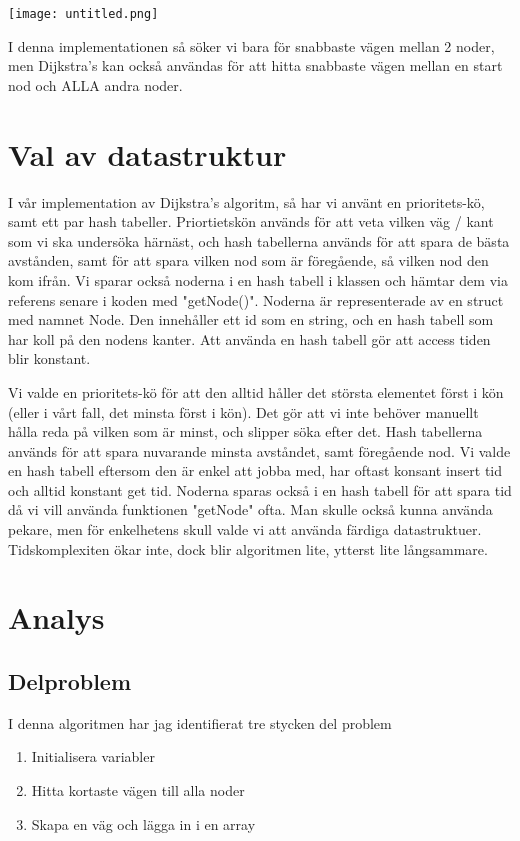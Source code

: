 \documentclass[fleqn,10pt]{article}
\begin{document}
\texttt{[image: untitled.png]}



I denna implementationen så söker vi bara för snabbaste vägen mellan 2 noder, men Dijkstra's kan också användas för att hitta snabbaste vägen mellan en start nod och ALLA andra noder.
\section{Val av datastruktur}

I vår implementation av Dijkstra's algoritm, så har vi använt en prioritets-kö, samt ett par hash tabeller. Priortietskön används för att veta vilken väg / kant som vi ska undersöka härnäst, och hash tabellerna används för att spara de bästa avstånden, samt för att spara vilken nod som är föregående, så vilken nod den kom ifrån. Vi sparar också noderna i en hash tabell i klassen och hämtar dem via referens senare i koden med "getNode()". Noderna är representerade av en struct med namnet Node. Den innehåller ett id som en string, och en hash tabell som har koll på den nodens kanter. Att använda en hash tabell gör att access tiden blir konstant.

Vi valde en prioritets-kö för att den alltid håller det största elementet först i kön (eller i vårt fall, det minsta först i kön). Det gör att vi inte behöver manuellt hålla reda på vilken som är minst, och slipper söka efter det. Hash tabellerna används för att spara nuvarande minsta avståndet, samt föregående nod. Vi valde en hash tabell eftersom den är enkel att jobba med, har oftast konsant insert tid  och alltid konstant get tid. Noderna sparas också i en hash tabell för att spara tid då vi vill använda funktionen "getNode" ofta. Man skulle också kunna använda pekare, men för enkelhetens skull valde vi att använda färdiga datastruktuer. Tidskomplexiten ökar inte, dock blir algoritmen lite, ytterst lite långsammare.
\section{Analys}
\subsection{Delproblem}
I denna algoritmen har jag identifierat tre stycken del problem
\begin{enumerate}
    \item Initialisera variabler
    \item Hitta kortaste vägen till alla noder
    \item Skapa en väg och lägga in i en array
\end{enumerate}
\end{document}
